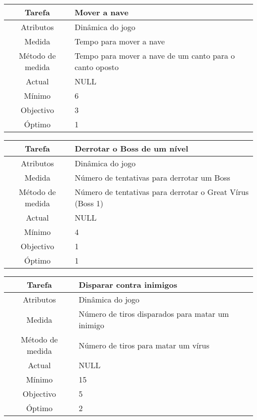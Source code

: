 \begin{center}
	\begin{tabular} {|c|p{10cm}|}
		\hline
		Tarefa & Mover a nave \\
		\hline
		Atributos & Dinâmica do jogo \\
		\hline
		Medida & Tempo para mover a nave \\
		\hline
		Método de medida & Tempo para mover a nave de um canto para o canto oposto \\
		\hline
		Actual & NULL \\
		Mínimo & 6 \\
		Objectivo & 3 \\
		Óptimo & 1 \\
		\hline
	\end{tabular}
\end{center}

\begin{center}
	\begin{tabular} {|c|p{10cm}|}
		\hline
		Tarefa & Derrotar o Boss de um nível \\
		\hline
		Atributos & Dinâmica do jogo \\
		\hline
		Medida & Número de tentativas para derrotar um Boss \\
		\hline
		Método de medida & Número de tentativas para derrotar o Great Vírus (Boss 1) \\
		\hline
		Actual & NULL \\
		Mínimo & 4 \\
		Objectivo & 1 \\
		Óptimo & 1 \\
		\hline
	\end{tabular}
\end{center}

\begin{center}
	\begin{tabular} {|c|p{10cm}|}
		\hline
		Tarefa & Disparar contra inimigos \\
		\hline
		Atributos & Dinâmica do jogo \\
		\hline
		Medida & Número de tiros disparados para matar um inimigo \\
		\hline
		Método de medida & Número de tiros para matar um vírus \\
		\hline
		Actual & NULL \\
		Mínimo & 15 \\
		Objectivo & 5 \\
		Óptimo & 2 \\
		\hline
	\end{tabular}
\end{center}





